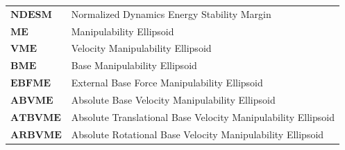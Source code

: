 \begin{table}[H]
\begin{tabular}{ll}
        $\bm{NDESM}$ & Normalized Dynamics Energy Stability Margin\\[2pt]
        $\bm{ME}$ & Manipulability Ellipsoid \\[2pt]
        $\bm{VME}$ & Velocity Manipulability Ellipsoid \\[2pt]
        $\bm{BME}$ & Base Manipulability Ellipsoid \\[2pt]
        $\bm{EBFME}$ & External Base Force Manipulability Ellipsoid \\[2pt]
        $\bm{ABVME}$ & Absolute Base Velocity Manipulability Ellipsoid\\[2pt]
        $\bm{ATBVME}$ & Absolute Translational Base Velocity Manipulability Ellipsoid\\[2pt]
        $\bm{ARBVME}$ & Absolute Rotational Base Velocity Manipulability Ellipsoid\\[2pt]

    \end{tabular}
\end{table}
\newpage
